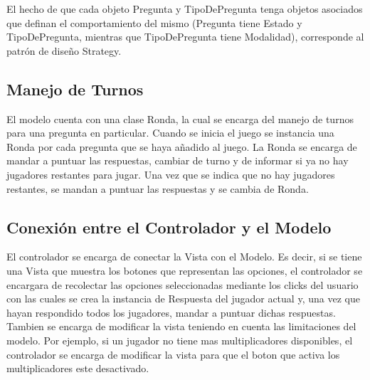 \documentclass[titlepage,a4paper]{article}
\begin{document}
El hecho de que cada objeto Pregunta y TipoDePregunta tenga objetos asociados que definan el comportamiento del mismo (Pregunta tiene Estado y TipoDePregunta, mientras que TipoDePregunta tiene Modalidad), corresponde al patrón de diseño Strategy.

\subsection{Manejo de Turnos}

El modelo cuenta con una clase Ronda, la cual se encarga del manejo de turnos para una pregunta en particular. Cuando se inicia el juego se instancia una Ronda por cada pregunta que se haya añadido al juego. La Ronda se encarga de mandar a puntuar las respuestas, cambiar de turno y de informar si ya no hay jugadores restantes para jugar. Una vez que se indica que no hay jugadores restantes, se mandan a puntuar las respuestas y se cambia de Ronda.

\subsection{Conexión entre el Controlador y el Modelo}

El controlador se encarga de conectar la Vista con el Modelo. Es decir, si se tiene una Vista que muestra los botones que representan las opciones, el controlador se encargara de recolectar las opciones seleccionadas mediante los clicks del usuario con las cuales se crea la instancia de Respuesta del jugador actual y, una vez que hayan respondido todos los jugadores, mandar a puntuar dichas respuestas. Tambien se encarga de modificar la vista teniendo en cuenta las limitaciones del modelo. Por ejemplo, si un jugador no tiene mas multiplicadores disponibles, el controlador se encarga de modificar la vista para que el boton que activa los multiplicadores este desactivado.
\end{document}
